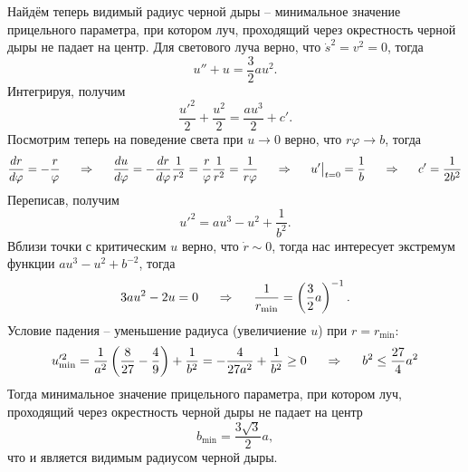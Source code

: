 Найдём теперь видимый радиус черной дыры -- минимальное значение прицельного параметра, при котором луч, проходящий через окрестность черной дыры не падает на центр. Для светового луча верно, что $\dot{s}^2=v^2=0$, тогда
$$
    u'' + u = \frac{3}{2} a u^2.
$$
Интегрируя, получим
$$
    \frac{u'^2}{2} + \frac{u^2}{2} = \frac{au^3}{2} + c'.
$$
Посмотрим теперь на поведение света при $u \to 0$ верно, что $r\varphi \to b$, тогда 
$$
    \frac{dr}{d\varphi} = - \frac{r}{\varphi} 
    \hspace{0.5cm} \Rightarrow \hspace{0.5cm} 
    \frac{du}{d\varphi} = - \frac{dr}{d\varphi} \frac{1}{r^2} = \frac{r}{\varphi} \frac{1}{r^2} = \frac{1}{r \varphi}
    \hspace{0.5cm} \Rightarrow \hspace{0.5cm} 
    u'\big|_{t=0} = \frac{1}{b} 
    \hspace{0.5cm} \Rightarrow \hspace{0.5cm} 
    c' = \frac{1}{2b^2} 
$$
Переписав, получим
$$
    u'^2 = au^3 - u^2 + \frac{1}{b^2}.
$$
Вблизи точки с критическим $u$ верно, что $\dot{r} \sim 0$, тогда нас интересует экстремум функции $au^3 - u^2 + b^{-2}$, тогда
$$
    3 a u^2 - 2 u = 0
    \hspace{0.5cm} \Rightarrow \hspace{0.5cm} 
    \frac{1}{r_{\text{min}}} = \left(\frac{3}{2} a\right)^{-1}.
$$
Условие падения -- уменьшение радиуса (увеличиение $u$) при $r=r_{\text{min}}$:
$$
    u'^2_{\text{min}} = \frac{1}{a^2} \left(
        \frac{8}{27} - \frac{4}{9} 
    \right) + \frac{1}{b^2} =
    -\frac{4}{27a^2}  + \frac{1}{b^2}  \geq 0
    \hspace{0.5cm} \Rightarrow \hspace{0.5cm} 
    b^2 \leq \frac{27}{4} a^2
$$
Тогда минимальное значение прицельного параметра, при котором луч, проходящий через окрестность черной дыры не падает на центр
\begin{equation}
    \boxed{b_{\text{min}} = \frac{3\sqrt{3}}{2} a},
\end{equation}
что и является видимым радиусом черной дыры.